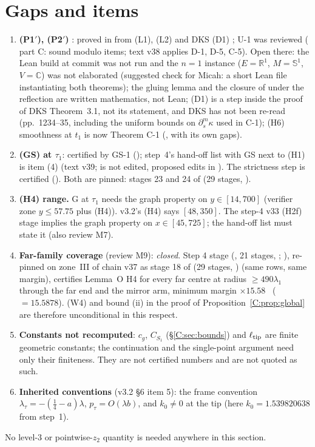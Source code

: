 \documentclass[11pt]{article}
\begin{document}
\section{Gaps and items}\label{C:sec:gaps}
\begin{enumerate}[leftmargin=*]
\item \textbf{(P1$'$), (P2$'$)} \tH: proved in  from (L1), (L2) \cite{CWFlow} and DKS (D1) \cite{DKS2002}; U-1 was reviewed ( part C: sound modulo items; text v38 applies D-1, D-5, C-5). Open there: the Lean build at commit  was not run and the $n=1$ instance ($E=\mathbb R^1$, $M=\mathbb S^1$, $V=\mathbb C$) was not elaborated (suggested check for Micah: a short Lean file instantiating both theorems); the gluing lemma and the closure of  under the reflection are written mathematics, not Lean; (D1) is a step inside the proof of DKS Theorem~3.1, not its statement, and DKS has not been re-read (pp.~1234--35, including the uniform bounds on $\partial_s^m\kappa$ used in C-1); (H6) smoothness at $t_1$ is now Theorem C-1 (, with its own gaps).
\item \textbf{(GS) at $\tau_1$}: certified by GS-1 (); step~4's hand-off list with GS next to (H1) is  item (4) (text v39;  is not edited, proposed edits in ). The strictness step is certified (). Both are pinned: stages 23 and 24 of  (29 stages, ).
\item \textbf{(H4) range.} G at $\tau_1$ needs the graph property on $y\in[14,700]$ (verifier zone $y\le57.75$ plus (H4)). v3.2's (H4) says $[48,350]$. The step-4 v33 (H2f) stage implies the graph property on $x\in[45,725]$; the hand-off list must state it (also review M7).
\item \textbf{Far-family coverage} (review M9): \emph{closed}. Step 4 stage  (, 21 stages, ; ), re-pinned on zone~III of chain v37 as stage 18 of  (29 stages, ) (same rows, same margin), certifies Lemma~O H4 for every far centre at radius $\ge490\lambda_1$ through the far end and the mirror arm, minimum margin $\times15.58$ \tC\ ($=15.5878$). (W4) and bound (ii) in the proof of Proposition~\ref{C:prop:global} are therefore unconditional in this respect.
\item \textbf{Constants not recomputed}: $c_g$, $C_{S_1}$ (\S\ref{C:sec:bounds}) and $\ell_{\rm tip}$ are finite geometric constants; the continuation and the single-point argument need only their finiteness. They are not certified numbers and are not quoted as such.
\item \textbf{Inherited conventions} (v3.2 \S6 item 5): the frame convention $\lambda_\tau=-(\frac14-a)\lambda$, $p_\tau=O(\lambda b)$, and $k_0\ne0$ at the tip (here $k_0=1.539820638$ from step~1).
\end{enumerate}
No level-3 or pointwise-$z_2$ quantity is needed anywhere in this section.
\end{document}
